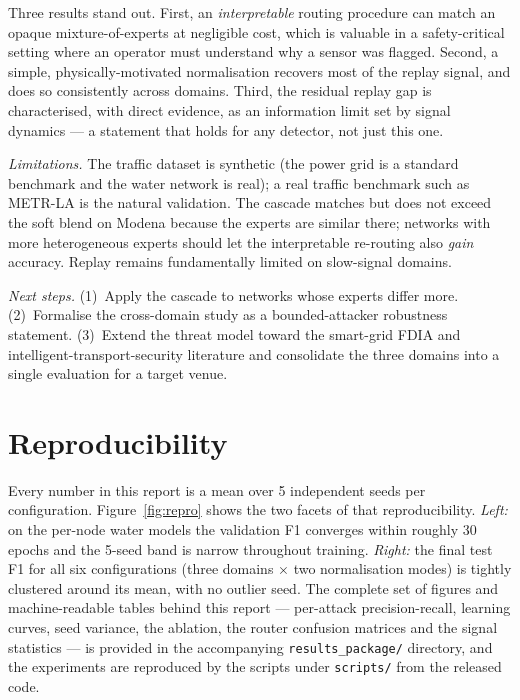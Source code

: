 \documentclass[10pt,a4paper]{article}
\begin{document}
Three results stand out. First, an \emph{interpretable} routing procedure
can match an opaque mixture-of-experts at negligible cost, which is
valuable in a safety-critical setting where an operator must understand why
a sensor was flagged. Second, a simple, physically-motivated normalisation
recovers most of the replay signal, and does so consistently across
domains. Third, the residual replay gap is characterised, with direct
evidence, as an information limit set by signal dynamics --- a statement
that holds for any detector, not just this one.

\emph{Limitations.} The traffic dataset is synthetic (the power grid is a
standard benchmark and the water network is real); a real traffic benchmark
such as METR-LA is the natural validation. The cascade matches but does not
exceed the soft blend on Modena because the experts are similar there;
networks with more heterogeneous experts should let the interpretable
re-routing also \emph{gain} accuracy. Replay remains fundamentally limited
on slow-signal domains.

\emph{Next steps.} (1)~Apply the cascade to networks whose experts differ
more. (2)~Formalise the cross-domain study as a bounded-attacker robustness
statement. (3)~Extend the threat model toward the smart-grid FDIA and
intelligent-transport-security literature and consolidate the three domains
into a single evaluation for a target venue.

\section{Reproducibility}

Every number in this report is a mean over 5 independent seeds per
configuration. Figure~\ref{fig:repro} shows the two facets of that
reproducibility. \emph{Left:} on the per-node water models the validation
F1 converges within roughly 30 epochs and the 5-seed band is narrow
throughout training. \emph{Right:} the final test F1 for all six
configurations (three domains $\times$ two normalisation modes) is tightly
clustered around its mean, with no outlier seed. The complete set of
figures and machine-readable tables behind this report --- per-attack
precision-recall, learning curves, seed variance, the ablation, the router
confusion matrices and the signal statistics --- is provided in the
accompanying \texttt{results\_package/} directory, and the experiments are
reproduced by the scripts under \texttt{scripts/} from the released code.
\end{document}
